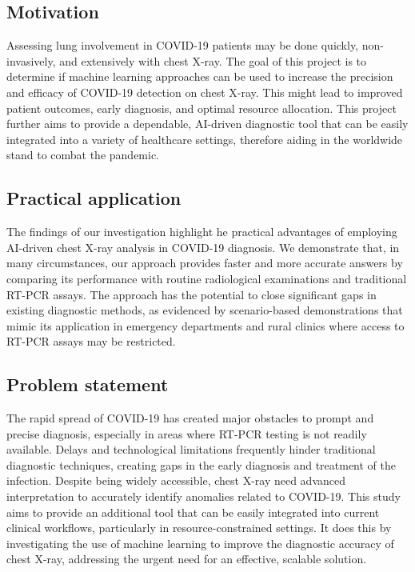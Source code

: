 \documentclass[12pt]{article}
\begin{document}
\subsection{Motivation}
Assessing lung involvement in COVID-19 patients may be done quickly, non-invasively, and extensively with chest X-ray. The goal of this project is to determine if machine learning approaches can be used to increase the precision and efficacy of COVID-19 detection on chest X-ray. This might lead to improved patient outcomes, early diagnosis, and optimal resource allocation. This project further aims to provide a dependable, AI-driven diagnostic tool that can be easily integrated into a variety of healthcare settings, therefore aiding in the worldwide stand to combat the pandemic.

\subsection{Practical application}
The findings of our investigation highlight he practical advantages of employing AI-driven chest X-ray analysis in COVID-19 diagnosis. We demonstrate that, in many circumstances, our approach provides faster and more accurate answers by comparing its performance with routine radiological examinations and traditional RT-PCR assays. The approach has the potential to close significant gaps in existing diagnostic methods, as evidenced by scenario-based demonstrations that mimic its application in emergency departments and rural clinics where access to RT-PCR assays may be restricted.

\subsection{Problem statement}
The rapid spread of COVID-19 has created major obstacles to prompt and precise diagnosis, especially in areas where RT-PCR testing is not readily available. Delays and technological limitations frequently hinder traditional diagnostic techniques, creating gaps in the early diagnosis and treatment of the infection. Despite being widely accessible, chest X-ray need advanced interpretation to accurately identify anomalies related to COVID-19. This study aims to provide an additional tool that can be easily integrated into current clinical workflows, particularly in resource-constrained settings. It does this by investigating the use of machine learning to improve the diagnostic accuracy of chest X-ray, addressing the urgent need for an effective, scalable solution.
\end{document}
